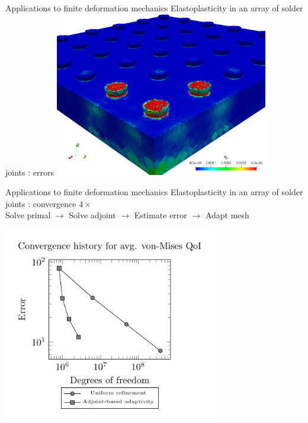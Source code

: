 \documentclass[fleqn]{beamer}
\begin{document}

\begin{frame}{Applications to finite deformation mechanics}
{Elastoplasticity in an array of solder joints : errors}
\centering
\includegraphics[width=0.7\textwidth]{../img/aut_solder_error}
\end{frame}


\begin{frame}{Applications to finite deformation mechanics}
{Elastoplasticity in an array of solder joints : convergence}
$4 \times$ \\
Solve primal $\rightarrow$ Solve adjoint $\rightarrow$
Estimate error $\rightarrow$ Adapt mesh
\begin{center}
\includegraphics[width=0.7\textwidth]{../img/aut_solder_convergence}
\end{center}
\end{frame}
\end{document}

